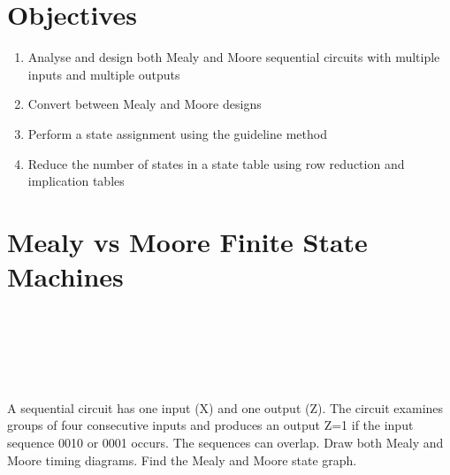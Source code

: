 \section{Objectives}
\begin{enumerate}
  \item Analyse and design both Mealy and Moore sequential circuits with multiple inputs and multiple outputs
  \item Convert between Mealy and Moore designs
  \item Perform a state assignment using the guideline method
   \item Reduce the number of states in a state table using row reduction and
     implication tables
\end{enumerate}

\section{Mealy vs Moore Finite State Machines}
\begin{definition}~\cite[Sec~3.4]{harris2022digital}
\end{definition}
\vspace{5em}

\begin{definition}~\cite[Sec~3.4.3]{harris2022digital}
\end{definition}
\vspace{5em}

\begin{definition}~\cite[Sec~3.4.3]{harris2022digital}
\end{definition}
\vspace{5em}


\begin{example}
  A sequential circuit has one input (X) and one output (Z). The circuit
  examines groups of four consecutive inputs and produces an output Z=1 if the
  input sequence 0010 or 0001 occurs. The sequences can overlap. Draw both Mealy
  and Moore timing diagrams. Find the Mealy and Moore state graph.
\end{example}
\vspace{20em}

